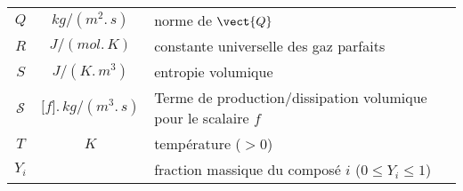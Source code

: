 \begin{table}[h!]
\begin{tabular}{ccp{}}
$Q$                 & $kg/(m^2.\,s)$& norme de $\vect{Q}$\\
$R$                 & $J/(mol.\,K)$ & constante universelle des gaz parfaits\\
$S$                 & $J/(K.\,m^3)$        & entropie volumique\\
$\mathcal{S}$         & $\lbrack f\rbrack.\,kg/(m^3.\,s)$
                                & Terme de production/dissipation volumique
                                        pour le scalaire $f$\\
$T$                 & $K$                 & temp\'erature ($>0$)\\
$Y_i$                 &                 & fraction massique du compos\'e $i$
                                        ($0 \leqslant Y_i \leqslant 1$)\\
\end{tabular}
\end{table}

\clearpage

